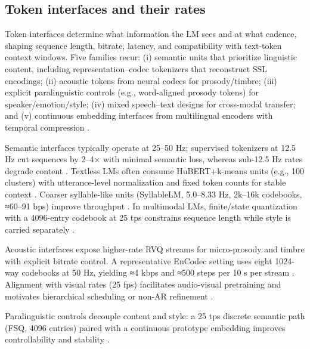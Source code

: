 \documentclass{article}
\begin{document}
\subsection{Token interfaces and their rates} \label{subsec:Token interfaces and their rates}
Token interfaces determine what information the LM sees and at what cadence, shaping sequence length, bitrate, latency, and compatibility with text-token context windows. Five families recur: (i) semantic units that prioritize linguistic content, including representation–codec tokenizers that reconstruct SSL encodings; (ii) acoustic tokens from neural codecs for prosody/timbre; (iii) explicit paralinguistic controls (e.g., word-aligned prosody tokens) for speaker/emotion/style; (iv) mixed speech–text designs for cross-modal transfer; and (v) continuous embedding interfaces from multilingual encoders with temporal compression \cite{qian2025prosodylmuncoveringemergingprosodyproces,fily2024establishingdegreesclosenessbetweenaudio,entry2025towardjointlanguagemodelingspeechunitste,huang2024repcodecspeechrepresentationcodectokeniz}.

Semantic interfaces typically operate at 25–50 Hz; supervised tokenizers at 12.5 Hz cut sequences by 2–4× with minimal semantic loss, whereas sub-12.5 Hz rates degrade content \cite{zeng2024scalingspeechtextpretrainingsyntheticint}. Textless LMs often consume HuBERT+k-means units (e.g., 100 clusters) with utterance-level normalization and fixed token counts for stable context \cite{hsu2024exploringcontextlearningtextlessspeechla}. Coarser syllable-like units (SyllableLM, 5.0–8.33 Hz, 2k–16k codebooks, ≈60–91 bps) improve throughput \cite{baade2024syllablelmlearningcoarsesemanticunitsspe}. In multimodal LMs, finite/state quantization with a 4096-entry codebook at 25 tps constrains sequence length while style is carried separately \cite{chen2025emovaempoweringlanguagemodelsseehearspea}.

Acoustic interfaces expose higher-rate RVQ streams for micro‑prosody and timbre with explicit bitrate control. A representative EnCodec setting uses eight 1024-way codebooks at 50 Hz, yielding ≈4 kbps and ≈500 steps per 10 s per stream \cite{peng2024mslms2stmultitaskspeechlanguagemodeltext}. Alignment with visual rates (25 fps) facilitates audio-visual pretraining and motivates hierarchical scheduling or non-AR refinement \cite{sadok2025vectorquantizedmaskedautoencoderaudiovis,peng2024mslms2stmultitaskspeechlanguagemodeltext}.

Paralinguistic controls decouple content and style: a 25 tps discrete semantic path (FSQ, 4096 entries) paired with a continuous prototype embedding improves controllability and stability \cite{chen2025emovaempoweringlanguagemodelsseehearspea}.
\end{document}
